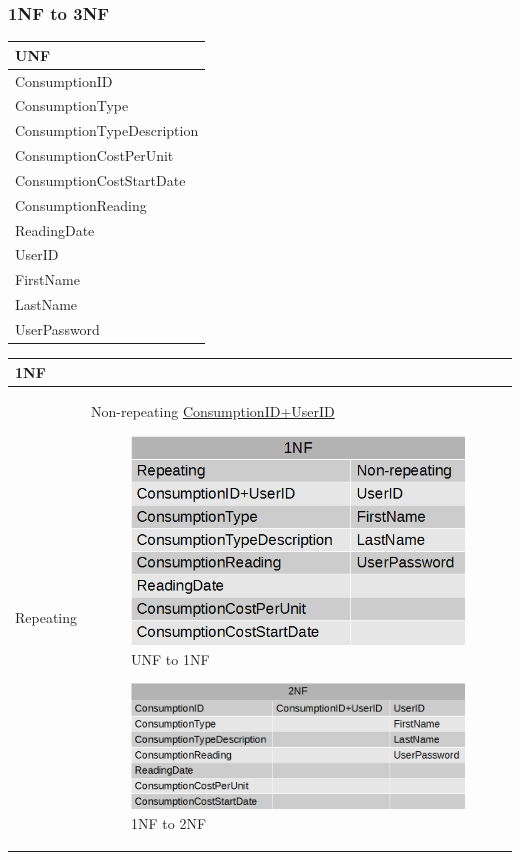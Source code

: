 \subsubsection{1NF to 3NF}
\begin{center}
	\begin{tabular}{|p{4cm}|}
		\hline
		\textbf{UNF} \\ \hline
		ConsumptionID \\ \hline
		ConsumptionType \\ \hline
		ConsumptionTypeDescription \\ \hline
		ConsumptionCostPerUnit \\ \hline
		ConsumptionCostStartDate \\ \hline
		ConsumptionReading \\ \hline
		ReadingDate \\ \hline
		UserID \\ \hline
		FirstName \\ \hline
		LastName \\ \hline
		UserPassword \\ \hline
	\end{tabular}
	
	\begin{tabular}{|p{4.5cm}|p{4cm}}
		\hline
		\textbf{1NF} &  \\ \hline
		Repeating & Non-repeating
		\underline{ConsumptionID+UserID}
			

\begin{figure}[H]
\includegraphics{./design/1NF.png}
\caption{UNF to 1NF}
\end{figure}

\begin{figure}[H]
\includegraphics{./design/2NF.png}
\caption{1NF to 2NF}
\end{figure}


\end{tabular}
\end{center}

